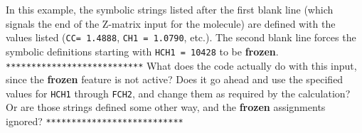 
In this example, the symbolic strings listed after the first blank line
(which signals the end of the Z-matrix input for the molecule) are defined
with the values listed ({\tt CC= 1.4888}, {\tt CH1 = 1.0790}, etc.).  The
second blank line forces the symbolic definitions starting with {\tt HCH1
= 10428} to be {\bf frozen}.
\Large
\verb+***************************+
What does the code actually do with this input, since the {\bf frozen}
feature is not active?  Does it go ahead and use the specified values
for {\tt HCH1} through {\tt FCH2}, and change them as required by the
calculation?  Or are those strings defined some other way, and the
{\bf frozen} assignments ignored?
\verb+***************************+
\normalsize
